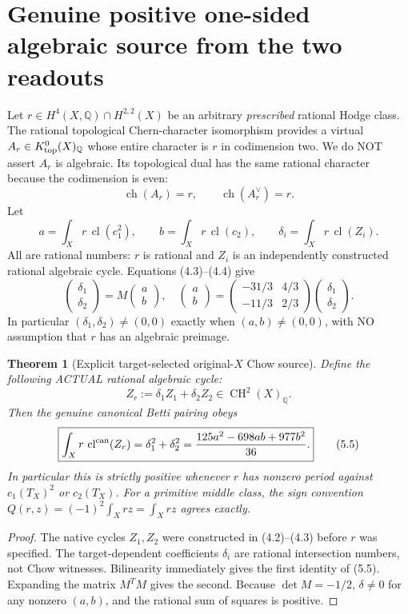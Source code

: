 \documentclass[11pt]{article}
\newcommand{\Q}{\mathbb Q}
\newcommand{\CH}{\operatorname{CH}}
\newcommand{\ch}{\operatorname{ch}}
\newcommand{\cl}{\operatorname{cl}}
\newtheorem{theorem}{Theorem}[section]
\begin{document}
\section{Genuine positive one-sided algebraic source from the two readouts}
Let \(r\in H^{4}(X,\Q)\cap H^{2,2}(X)\) be an arbitrary
\emph{prescribed} rational Hodge class. The rational topological
Chern-character isomorphism provides a virtual
\(A_r\in K^0_{\rm top}(X)_{\Q}\) whose entire character is \(r\)
in codimension two. We do NOT assert \(A_r\) is algebraic.
Its topological dual has the same rational character because
the codimension is even:
\[
        \ch(A_r)=r,\qquad \ch(A_r^\vee)=r.             \tag{5.1}
\]
Let
\[
 a=\int_X r\,\cl(c_1^2),\qquad
 b=\int_X r\,\cl(c_2),
 \qquad
 \delta_i=\int_Xr\,\cl(Z_i).                          \tag{5.2}
\]
All are rational numbers: \(r\) is rational and \(Z_i\)
is an independently constructed rational algebraic cycle.
Equations (4.3)--(4.4) give
\[
 \begin{pmatrix}\delta_1\\\delta_2\end{pmatrix}
  =M\begin{pmatrix}a\\b\end{pmatrix},
 \quad
 \begin{pmatrix}a\\b\end{pmatrix}
  =\begin{pmatrix}-31/3&4/3\\-11/3&2/3\end{pmatrix}
     \begin{pmatrix}\delta_1\\\delta_2\end{pmatrix}. \tag{5.3}
\]
In particular \((\delta_1,\delta_2)\ne(0,0)\) exactly when
\((a,b)\ne(0,0)\), with NO assumption that \(r\) has an
algebraic preimage.

\begin{theorem}[Explicit target-selected original-\(X\) Chow source]
Define the following ACTUAL rational algebraic cycle:
\[
 \boxed{Z_r:=\delta_1 Z_1+\delta_2 Z_2
                    \in\CH^2(X)_{\Q}.}             \tag{5.4}
\]
Then the genuine canonical Betti pairing obeys
\[
 \boxed{
 \int_Xr\,\cl^{\rm can}(Z_r)
     =\delta_1^2+\delta_2^2
     =\frac{125a^2-698ab+977b^2}{36}.}             \tag{5.5}
\]
In particular this is strictly positive whenever
\(r\) has nonzero period against \(c_1(T_X)^2\) or \(c_2(T_X)\).
For a primitive middle class, the sign convention
\(Q(r,z)=(-1)^2\int_Xrz=\int_Xrz\) agrees exactly.
\end{theorem}
\begin{proof}
The native cycles \(Z_1,Z_2\) were constructed in (4.2)--(4.3)
before \(r\) was specified. The target-dependent coefficients
\(\delta_i\) are rational intersection numbers, not Chow
witnesses. Bilinearity immediately gives the first identity
of (5.5). Expanding the matrix \(M^TM\) gives the second.
Because \(\det M=-1/2\), \(\delta\ne0\) for any
nonzero \((a,b)\), and the rational sum of squares is positive.
\end{proof}
\end{document}
